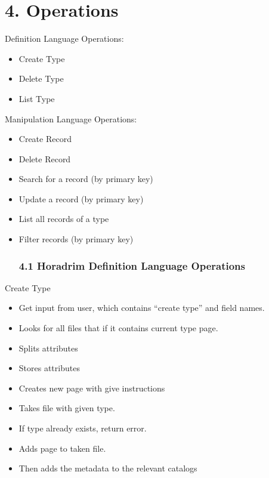 \documentclass[
]{article}
\begin{document}
\hypertarget{operations}{%
\section{4. Operations}\label{operations}}

Definition Language Operations:

\begin{itemize}
\item
  Create Type
\item
  Delete Type
\item
  List Type
\end{itemize}

Manipulation Language Operations:

\begin{itemize}
\item
  Create Record
\item
  Delete Record
\item
  Search for a record (by primary key)
\item
  Update a record (by primary key)
\item
  List all records of a type
\item
  Filter records (by primary key)

    \hypertarget{horadrim-definition-language-operations}{%
    \subsubsection{4.1 Horadrim Definition Language
    Operations}\label{horadrim-definition-language-operations}}
\end{itemize}

Create Type

\begin{itemize}
\item
  Get input from user, which contains ``create type'' and field names.
\item
  Looks for all files that if it contains current type page.
\item
  Splits attributes
\item
  Stores attributes
\item
  Creates new page with give instructions
\item
  Takes file with given type.
\item
  If type already exists, return error.
\item
  Adds page to taken file.
\item
  Then adds the metadata to the relevant catalogs
\end{itemize}
\end{document}
